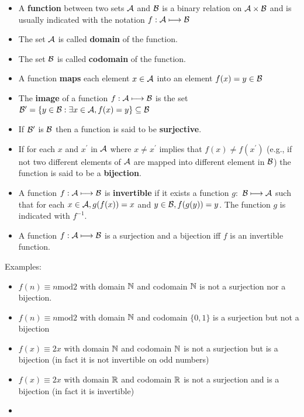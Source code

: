 \documentclass[justified,sixbynine]{tufte-book}
\def\func{\textrm}
\theoremstyle{plain}%
\theoremstyle{definition}
\theoremstyle{remark}
\begin{document}
\begin{fullwidth}
\begin{itemize}
\item  A {\bf function} between two sets ${\cal A}$ and ${\cal B}$ is a
binary relation on ${\cal A}\times {\cal B}$ and is usually indicated with
the notation $f:{\cal A}\longmapsto {\cal B}$

\item  The set ${\cal A}$ is called {\bf domain} of the function.

\item  The set ${\cal B}$ is called {\bf codomain} of the function.

\item  A function {\bf maps} each element $x\in {\cal A}$ into an element $%
f(x)=y\in {\cal B}$

\item  The {\bf image} of a function $f:{\cal A}\longmapsto {\cal B}$ is the
set ${\cal B}^{\prime }=\{y\in {\cal B}:\exists x\in {\cal A}%
,f(x)=y\}\subseteq {\cal B}$

\item  If ${\cal B}^{\prime }$ is ${\cal B}$ then a function is said to be
{\bf surjective}.

\item  If for each $x$ and $x^{\prime }$ in ${\cal A}$ where $x\neq
x^{\prime }$ implies that $f(x)\neq f(x^{\prime })$ (e.g., if not two
different elements of ${\cal A}$ are mapped into different element in ${\cal B%
}$) the function is said to be a {\bf bijection}.

\item  A function $f:{\cal A}\longmapsto {\cal B}$ is {\bf invertible} if it
exists a function $g:$ ${\cal B}\longmapsto {\cal A}$ such that for each $%
x\in {\cal A},g(f(x))=x$ and $y\in {\cal B},f(g(y))=y$. The function $g$ is
indicated with $f^{-1}$.

\item  A function $f:{\cal A}\longmapsto {\cal B}$ is a surjection and a
bijection iff $f$ is an invertible function.
\end{itemize}

Examples:

\begin{itemize}
\item
$f(n)\equiv n\func{mod}2$ with domain ${\Bbb N}$ and codomain $%
{\Bbb N}$ is not a surjection nor a bijection.
\item
$f(n)\equiv n\func{mod}2$ with domain ${\Bbb N}$ and codomain $%
\{0,1\}$ is a surjection but not a bijection
\item
$f(x)\equiv 2x$ with domain ${\Bbb N}$ and codomain ${\Bbb N}$ is
not a surjection but is a bijection (in fact it is not invertible on odd
numbers)
\item
$f(x)\equiv 2x$ with domain ${\Bbb R}$ and codomain ${\Bbb R}$ is
not a surjection and is a bijection (in fact it is invertible)
\item
\end{itemize}


\end{fullwidth}
\end{document}
